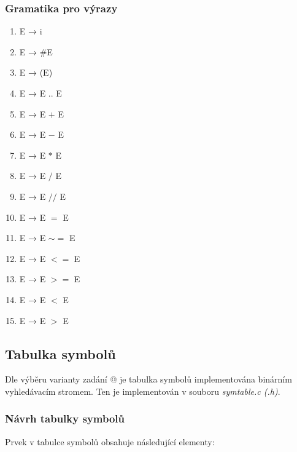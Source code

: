 \documentclass[a4paper, 12pt]{article}
\makeatletter
\newcommand*{\rom}[1]{\expandafter\@slowromancap\romannumeral #1@}
\makeatother
\begin{document}
\newpage

\subsubsection{Gramatika pro výrazy}

\begin{enumerate}
    \item E → i
    \item E → $\#$E
    \item E → (E)
    \item E → E $..$ E
    \item E → E $+$ E
    \item E → E $-$ E
    \item E → E $*$ E
    \item E → E $/$ E
    \item E → E $//$ E
    \item E → E $=$ E
    \item E → E $\sim=$ E
    \item E → E $<=$ E
    \item E → E $>=$ E
    \item E → E $<$ E
    \item E → E $>$ E
\end{enumerate}

\newpage

\subsection{Tabulka symbolů}
Dle výběru varianty zadání \rom{1} je tabulka symbolů implementována binárním vyhledávacím stromem. Ten je implementován v souboru \textit{symtable.c (.h)}.

\subsubsection{Návrh tabulky symbolů}
Prvek v tabulce symbolů obsahuje následující elementy:

\vspace{1cm}
\end{document}
